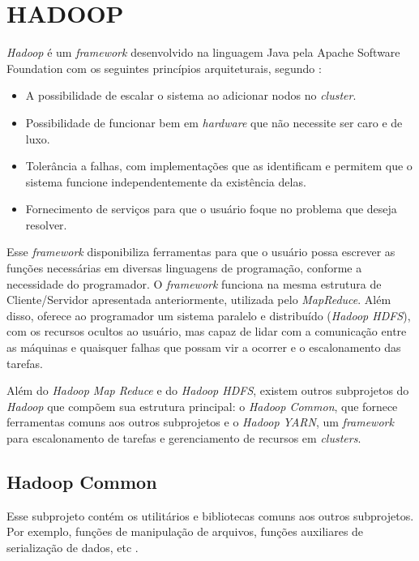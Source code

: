
\section{HADOOP} \label{sec:hadoop}

\textit{Hadoop} é um \textit{\gls{framework}} desenvolvido na linguagem Java pela Apache Software Foundation com os seguintes princípios arquiteturais, segundo \textcite{ImprovingNavarro18}:
\begin{itemize}
  \item A possibilidade de escalar o sistema ao adicionar nodos no \textit{cluster}.
  \item Possibilidade de funcionar bem em \textit{\gls{hardware}} que não necessite ser caro e de luxo.
  \item Tolerância a falhas, com implementações que as identificam e permitem que o sistema funcione independentemente da existência delas.
  \item Fornecimento de serviços para que o usuário foque no problema que deseja resolver.
\end{itemize}

Esse \textit{\gls{framework}} disponibiliza ferramentas para que o usuário possa escrever as funções necessárias em diversas linguagens de programação, conforme a necessidade do programador. O \textit{\gls{framework}} funciona na mesma estrutura de Cliente/Servidor apresentada anteriormente, utilizada pelo \textit{MapReduce}. Além disso, oferece ao programador um sistema paralelo e distribuído (\textit{Hadoop HDFS}), com os recursos ocultos ao usuário, mas capaz de lidar com a comunicação entre as máquinas e quaisquer falhas que possam vir a ocorrer e o escalonamento das tarefas.

Além do \textit{Hadoop Map Reduce} e do \textit{Hadoop HDFS}, existem outros subprojetos do \textit{Hadoop} que compõem sua estrutura principal: o \textit{Hadoop Common}, que fornece ferramentas comuns aos outros subprojetos e o \textit{Hadoop YARN}, um \textit{\gls{framework}} para escalonamento de tarefas e gerenciamento de recursos em \textit{clusters}.

\subsection{Hadoop Common}\label{ssec:hadoopcommon}

Esse subprojeto contém os utilitários e bibliotecas comuns aos outros subprojetos. Por exemplo, funções de manipulação de arquivos, funções auxiliares de serialização de dados, etc \cite{GoldmanApache12}.

